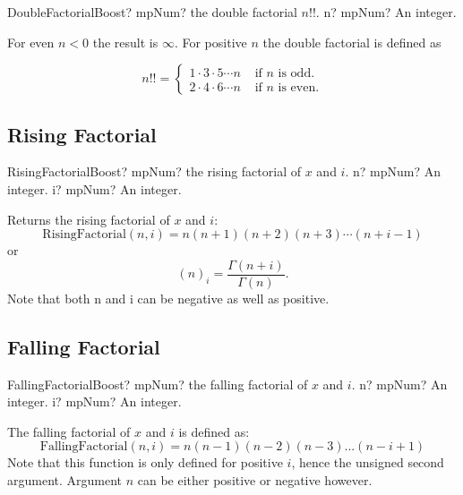 \begin{mpFunctionsExtract}
	\mpFunctionOne
	{DoubleFactorialBoost? mpNum? the double factorial $n!!$.}
	{n? mpNum? An integer.}
\end{mpFunctionsExtract}

\vspace{0.3cm}
For even $n<0$ the result is $\infty$. For positive $n$ the double factorial is defined as

\begin{equation}
	n!!=\begin{cases}
		1 \cdot 3 \cdot 5 \cdots n  & \text{ if } n \text{ is odd.}\\
		2 \cdot 4 \cdot 6 \cdots n  & \text{ if } n \text{ is even.}
	\end{cases}
\end{equation}




\subsection{Rising Factorial}

\begin{mpFunctionsExtract}
	\mpFunctionTwo
	{RisingFactorialBoost? mpNum? the rising factorial of $x$ and $i$.}
	{n? mpNum? An integer.}
	{i? mpNum? An integer.}
\end{mpFunctionsExtract}

\vspace{0.3cm}
Returns the rising factorial of $x$ and $i$:
\begin{equation}
	\text{RisingFactorial}(n, i) = n(n+1)(n+2)(n+3) \cdots(n+i-1)
\end{equation}
or
\begin{equation}
	(n)_i = \frac{\Gamma(n+i)}{\Gamma(n)}.
\end{equation}
Note that both n and i can be negative as well as positive.



\subsection{Falling Factorial}

\begin{mpFunctionsExtract}
	\mpFunctionTwo
	{FallingFactorialBoost? mpNum? the falling factorial of $x$ and $i$.}
	{n? mpNum? An integer.}
	{i? mpNum? An integer.}
\end{mpFunctionsExtract}

\vspace{0.3cm}
The falling factorial of $x$ and $i$ is defined as:
\begin{equation}
	\text{FallingFactorial}(n, i) = n(n-1)(n-2)(n-3)...(n-i+1)
\end{equation}
Note that this function is only defined for positive $i$, hence the unsigned second argument. Argument $n$ can be either positive or
negative however.



